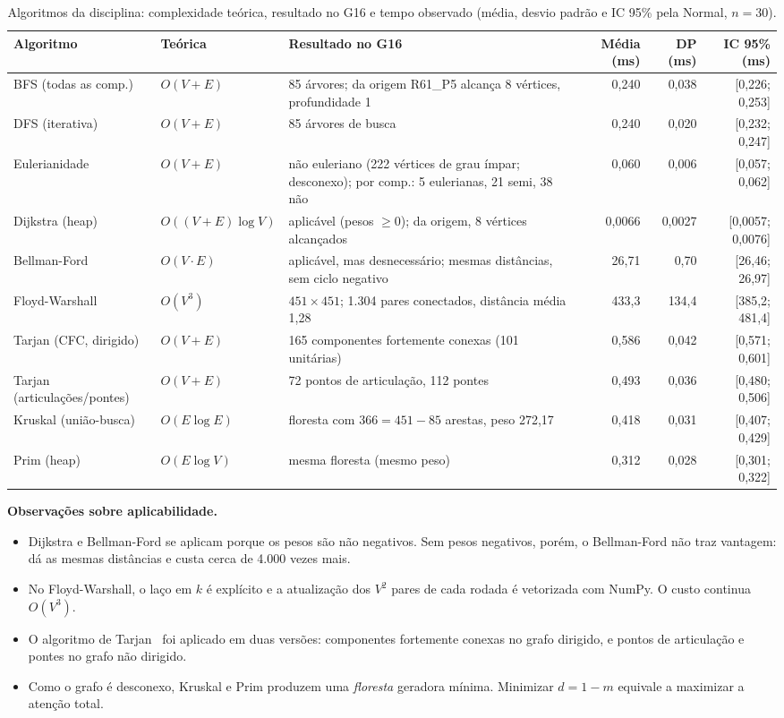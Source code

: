 \documentclass[sigconf]{acmart}
\begin{document}
\begin{table}[t]
\caption{Algoritmos da disciplina: complexidade teórica, resultado no G16 e tempo observado
(média, desvio padrão e IC 95\% pela Normal, $n=30$).}
\label{tab:alg}
\small
\begin{tabular}{llp{6.6cm}rrr}
\toprule
Algoritmo & Teórica & Resultado no G16 & Média (ms) & DP (ms) & IC 95\% (ms) \\
\midrule
BFS (todas as comp.) & $O(V+E)$ & 85 árvores; da origem R61\_P5 alcança 8 vértices, profundidade 1 & 0,240 & 0,038 & [0,226; 0,253] \\
DFS (iterativa) & $O(V+E)$ & 85 árvores de busca & 0,240 & 0,020 & [0,232; 0,247] \\
Eulerianidade & $O(V+E)$ & não euleriano (222 vértices de grau ímpar; desconexo); por comp.: 5 eulerianas, 21 semi, 38 não & 0,060 & 0,006 & [0,057; 0,062] \\
Dijkstra (heap) & $O((V+E)\log V)$ & aplicável (pesos $\ge 0$); da origem, 8 vértices alcançados & 0,0066 & 0,0027 & [0,0057; 0,0076] \\
Bellman-Ford & $O(V \cdot E)$ & aplicável, mas desnecessário; mesmas distâncias, sem ciclo negativo & 26,71 & 0,70 & [26,46; 26,97] \\
Floyd-Warshall & $O(V^3)$ & $451 \times 451$; 1.304 pares conectados, distância média 1,28 & 433,3 & 134,4 & [385,2; 481,4] \\
Tarjan (CFC, dirigido) & $O(V+E)$ & 165 componentes fortemente conexas (101 unitárias) & 0,586 & 0,042 & [0,571; 0,601] \\
Tarjan (articulações/pontes) & $O(V+E)$ & 72 pontos de articulação, 112 pontes & 0,493 & 0,036 & [0,480; 0,506] \\
Kruskal (união-busca) & $O(E\log E)$ & floresta com $366 = 451 - 85$ arestas, peso 272,17 & 0,418 & 0,031 & [0,407; 0,429] \\
Prim (heap) & $O(E\log V)$ & mesma floresta (mesmo peso) & 0,312 & 0,028 & [0,301; 0,322] \\
\bottomrule
\end{tabular}
\end{table}

\textbf{Observações sobre aplicabilidade.}
\begin{itemize}
  \item Dijkstra e Bellman-Ford se aplicam porque os pesos são não negativos. Sem pesos negativos,
  porém, o Bellman-Ford não traz vantagem: dá as mesmas distâncias e custa cerca de 4.000 vezes mais.
  \item No Floyd-Warshall, o laço em $k$ é explícito e a atualização dos $V^2$ pares de cada rodada é
  vetorizada com NumPy. O custo continua $O(V^3)$.
  \item O algoritmo de Tarjan~\cite{tarjan1972depth} foi aplicado em duas versões: componentes
  fortemente conexas no grafo dirigido, e pontos de articulação e pontes no grafo não dirigido.
  \item Como o grafo é desconexo, Kruskal e Prim produzem uma \emph{floresta} geradora mínima.
  Minimizar $d = 1-m$ equivale a maximizar a atenção total.
\end{itemize}
\end{document}
